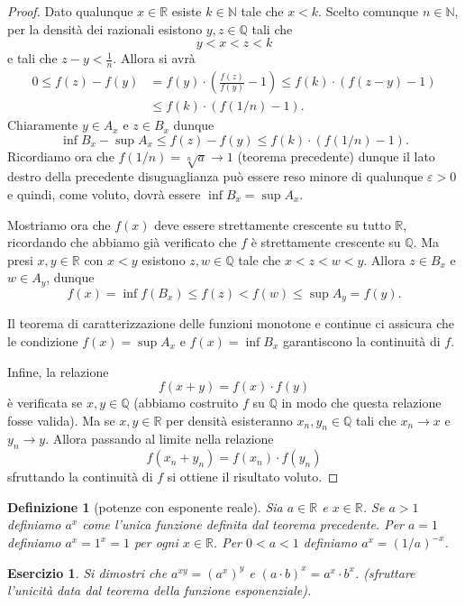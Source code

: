 \documentclass[italian,a4paper,oneside,headinclude]{scrbook}
\newcommand{\mymargin}[1]{\marginpar{#1}\index{#1}}
\newcommand{\eps}{\varepsilon}
\newcommand{\NN}{\mathbb N}
\newcommand{\QQ}{\mathbb Q}
\newcommand{\RR}{\mathbb R}
\newcommand{\enclose}[1]{{\left( #1 \right)}}
\newtheorem{exercise}[theorem]{Esercizio}
\newtheorem{definition}[theorem]{Definizione}
\begin{document}
\begin{proof}
Dato qualunque $x\in \RR$ esiste $k\in \NN$ tale che $x < k$.
Scelto comunque $n \in \NN$, per la densità dei razionali
esistono $y,z\in \QQ$ tali che
\[
  y < x < z < k
\]
e tali che $z-y< \frac 1 n$. Allora si avrà
\begin{align*}
  0 \le f(z) - f(y)
  &= f(y)\cdot\enclose{\frac{f(z)}{f(y)}-1}
  \le f(k)\cdot \enclose{f(z-y)-1}\\
  &\le f(k)\cdot \enclose{f(1/n)-1}.
\end{align*}
Chiaramente $y\in A_x$ e $z\in B_x$ dunque
\[
\inf B_x - \sup A_x \le f(z) - f(y) \le f(k) \cdot (f(1/n)-1).
\]
Ricordiamo ora che $f(1/n) = \sqrt[n]{a} \to 1$ (teorema precedente)
dunque il lato destro della precedente disuguaglianza può essere reso
minore di qualunque $\eps>0$
e quindi, come voluto,
dovrà essere $\inf B_x = \sup A_x$.

Mostriamo ora che $f(x)$ deve essere strettamente crescente su tutto $\RR$,
ricordando
che abbiamo già verificato che $f$ è strettamente crescente su $\QQ$.
Ma presi $x,y\in \RR$ con $x<y$ esistono $z,w\in \QQ$ tale che $x<z<w<y$.
Allora $z\in B_x$ e $w\in A_y$, dunque
\[
  f(x) = \inf f(B_x) \le f(z) < f(w) \le \sup A_y = f(y).
\]

Il teorema di caratterizzazione delle funzioni monotone e continue
ci assicura che le condizione $f(x) = \sup A_x$ e $f(x)= \inf B_x$
garantiscono la continuità di $f$.

Infine, la relazione
\[
  f(x+y) = f(x) \cdot f(y)
\]
è verificata se $x,y \in \QQ$ (abbiamo costruito $f$ su $\QQ$ in modo
che questa relazione fosse valida).
Ma se $x,y \in \RR$ per densità esisteranno $x_n, y_n\in \QQ$ tali
che $x_n\to x$ e $y_n\to y$. Allora passando al limite
nella relazione
\[
  f(x_n+y_n) = f(x_n)\cdot f(y_n)
\]
sfruttando la continuità di $f$ si ottiene il risultato voluto.
\end{proof}

\begin{definition}[potenze con esponente reale]
Sia $a\in \RR$ e $x\in \RR$.
\mymargin{$a^x$}
Se $a>1$ definiamo $a^x$ come
l'unica funzione definita dal teorema precedente.
Per $a=1$ definiamo $a^x = 1^x = 1$ per ogni $x\in \RR$.
Per $0<a<1$ definiamo $a^x = (1/a)^{-x}$.
\end{definition}

\begin{exercise}
Si dimostri che $a^{xy} = (a^x)^y$
e $(a\cdot b)^x = a^x \cdot b^x$.
(sfruttare l'unicità data dal teorema della funzione esponenziale).
\end{exercise}
\end{document}
